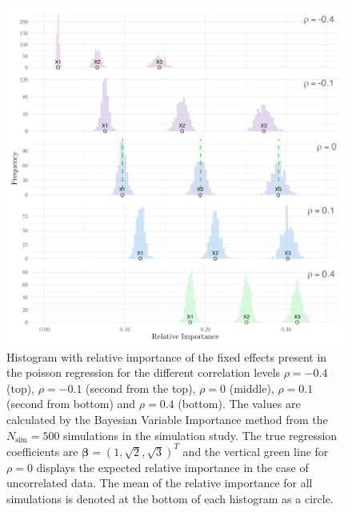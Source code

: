 \begin{figure}[H]
  \centering
  \includegraphics[width=1.1\linewidth]{Figures/Simulation study/Fixed_combined_poisson.png}
  \caption{Histogram with relative importance of the fixed effects present in the poisson regression for the different correlation levels $\rho=-0.4$ (top), $\rho=-0.1$ (second from the top), $\rho=0$ (middle), $\rho=0.1$ (second from bottom) and $\rho=0.4$ (bottom). The values are calculated by the Bayesian Variable Importance method from the $N_{\text{sim}}=500$ simulations in the simulation study. The true regression coefficients are $\boldsymbol{\beta}=(1, \sqrt{2}, \sqrt{3})^T$ and the vertical green line for $\rho=0$ displays the expected relative importance in the case of uncorrelated data. The mean of the relative importance for all simulations is denoted at the bottom of each histogram as a circle.}
  \label{fig:fixed_combined_poisson}
\end{figure}
